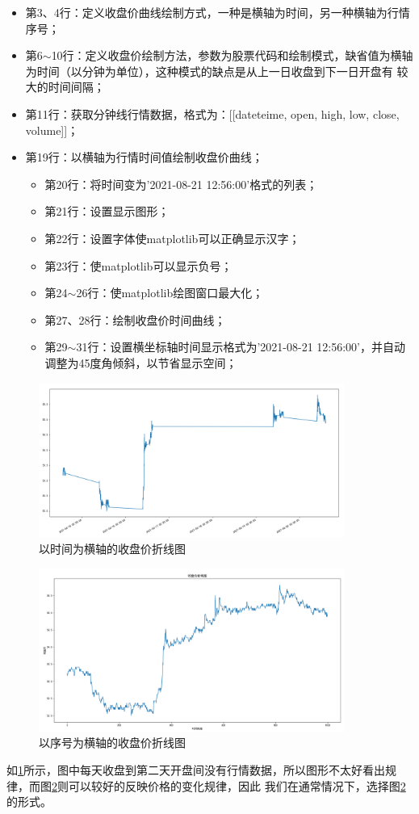 \begin{itemize}
    \item 第3、4行：定义收盘价曲线绘制方式，一种是横轴为时间，另一种横轴为行情序号；
    \item 第6$\sim$10行：定义收盘价绘制方法，参数为股票代码和绘制模式，缺省值为横轴为时间（以分钟为单位），这种模式的缺点是从上一日收盘到下一日开盘有
    较大的时间间隔；
    \item 第11行：获取分钟线行情数据，格式为：[[dateteime, open, high, low, close, volume]]；
    \item 第19行：以横轴为行情时间值绘制收盘价曲线；
    \begin{itemize}
        \item 第20行：将时间变为'2021-08-21 12:56:00'格式的列表；
        \item 第21行：设置显示图形；
        \item 第22行：设置字体使matplotlib可以正确显示汉字；
        \item 第23行：使matplotlib可以显示负号；
        \item 第24$\sim$26行：使matplotlib绘图窗口最大化；
        \item 第27、28行：绘制收盘价时间曲线；
        \item 第29$\sim$31行：设置横坐标轴时间显示格式为'2021-08-21 12:56:00'，并自动调整为45度角倾斜，以节省显示空间；
    \end{itemize}
\end{itemize}
\begin{figure}[H]
	\caption{以时间为横轴的收盘价折线图}
	\label{f000001}
	\centering
	\includegraphics[width=10cm]{images/f000001}
\end{figure}
\begin{figure}[H]
	\caption{以序号为横轴的收盘价折线图}
	\label{f000002}
	\centering
	\includegraphics[width=10cm]{images/f000002}
\end{figure}
如\ref{f000001}所示，图中每天收盘到第二天开盘间没有行情数据，所以图形不太好看出规律，而图\ref{f000002}则可以较好的反映价格的变化规律，因此
我们在通常情况下，选择图\ref{f000002}的形式。
